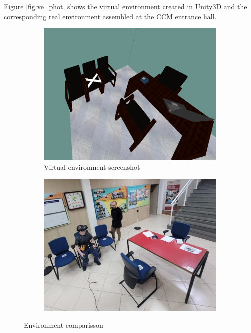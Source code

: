     Figure \ref{fig:ve_phot} shows the virtual environment created in Unity3D and the corresponding real environment assembled at the CCM entrance hall. 

    \begin{figure}[!htb]
        \centering
        \begin{subfigure}[b]{0.75\linewidth}
            \centering
            \includegraphics[width=\linewidth]{2 - Metodologia/VE.png}
            \caption{Virtual environment screenshot}
            \label{fig:ve_photo}
        \end{subfigure}
        \hfill
        \begin{subfigure}[b]{0.75\linewidth}
            \centering
            \includegraphics[width=\linewidth]{2 - Metodologia/RE.jpg}
            \caption{   }
            \label{fig:re_photo}
        \end{subfigure}
        \caption{Environment comparisson}
        \label{fig:ve_re}
    \end{figure}


